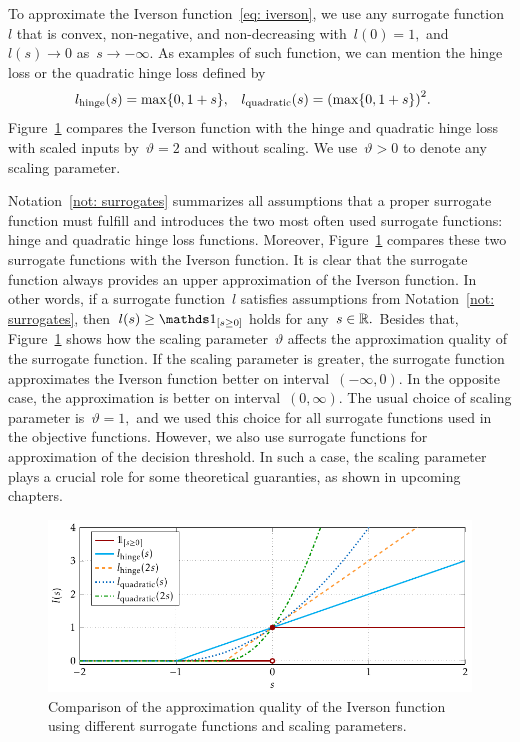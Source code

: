 \begin{notation}\label{not: surrogates}
  To approximate the Iverson function~\eqref{eq: iverson}, we use any surrogate function~$l$ that is convex, non-negative, and non-decreasing with~$l(0) = 1,$ and~$l(s) \to 0$ as~$s \to -\infty.$ As examples of such function, we can mention the hinge loss or the quadratic hinge loss defined by
  \begin{align*}
    l_{\text{hinge}}(s) & = \max\Brac[c]{0, 1 + s}, &
    l_{\text{quadratic}}(s) & = \Brac{\max\Brac[c]{0, 1 + s}}^2.
  \end{align*}
  Figure~\ref{fig: surrogates} compares the Iverson function with the hinge and quadratic hinge loss with scaled inputs by~$\vartheta = 2$ and without scaling. We use~$\vartheta > 0$ to denote any scaling parameter.
\end{notation}

Notation~\ref{not: surrogates} summarizes all assumptions that a proper surrogate function must fulfill and introduces the two most often used surrogate functions: hinge and quadratic hinge loss functions. Moreover, Figure~\ref{fig: surrogates} compares these two surrogate functions with the Iverson function. It is clear that the surrogate function always provides  an upper approximation of the Iverson function. In other words, if a surrogate function~$l$ satisfies assumptions from Notation~\ref{not: surrogates}, then~$l(s) \geq \Iverson{s \geq 0}$ holds for any~$s \in \mathbb{R}.$ Besides that, Figure~\ref{fig: surrogates} shows how the scaling parameter~$\vartheta$ affects the approximation quality of the surrogate function. If the scaling parameter is greater, the surrogate function approximates the Iverson function better on interval~$(-\infty, 0)$. In the opposite case, the approximation is better on interval~$(0, \infty)$. The usual choice of scaling parameter is~$\vartheta = 1,$ and we used this choice for all surrogate functions used in the objective functions. However, we also use surrogate functions for approximation of the decision threshold. In such a case, the scaling parameter plays a crucial role for some theoretical guaranties, as shown in upcoming chapters.

\begin{figure}[t]
  \centering
  \includegraphics[width = \linewidth]{images/surrogates.pdf}
  \caption{Comparison of the approximation quality of the Iverson function using different surrogate functions and scaling parameters.}
  \label{fig: surrogates}
\end{figure}

